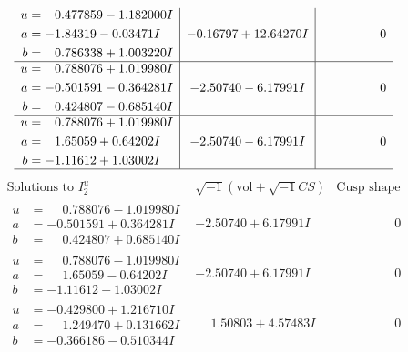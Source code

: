 \documentclass[1p]{elsarticle_modified}
\theoremstyle{definition}
\newcommand{\I}{\sqrt{-1}}
\begin{document}
$$\begin{array}{c|c|c}
\begin{aligned}
u &= \phantom{-}0.477859 - 1.182000 I \\
a &= -1.84319 - 0.03471 I \\
b &= \phantom{-}0.786338 + 1.003220 I\end{aligned}
 & -0.16797 + 12.64270 I & \phantom{-0.000000 } 0 \\ \hline\begin{aligned}
u &= \phantom{-}0.788076 + 1.019980 I \\
a &= -0.501591 - 0.364281 I \\
b &= \phantom{-}0.424807 - 0.685140 I\end{aligned}
 & -2.50740 - 6.17991 I & \phantom{-0.000000 } 0 \\ \hline\begin{aligned}
u &= \phantom{-}0.788076 + 1.019980 I \\
a &= \phantom{-}1.65059 + 0.64202 I \\
b &= -1.11612 + 1.03002 I\end{aligned}
 & -2.50740 - 6.17991 I & \phantom{-0.000000 } 0\\
 \hline 
 \end{array}$$\newpage$$\begin{array}{c|c|c}  
\text{Solutions to }I^u_{2}& \I (\text{vol} + \sqrt{-1}CS) & \text{Cusp shape}\\
 \hline 
\begin{aligned}
u &= \phantom{-}0.788076 - 1.019980 I \\
a &= -0.501591 + 0.364281 I \\
b &= \phantom{-}0.424807 + 0.685140 I\end{aligned}
 & -2.50740 + 6.17991 I & \phantom{-0.000000 } 0 \\ \hline\begin{aligned}
u &= \phantom{-}0.788076 - 1.019980 I \\
a &= \phantom{-}1.65059 - 0.64202 I \\
b &= -1.11612 - 1.03002 I\end{aligned}
 & -2.50740 + 6.17991 I & \phantom{-0.000000 } 0 \\ \hline\begin{aligned}
u &= -0.429800 + 1.216710 I \\
a &= \phantom{-}1.249470 + 0.131662 I \\
b &= -0.366186 - 0.510344 I\end{aligned}
 & \phantom{-}1.50803 + 4.57483 I & \phantom{-0.000000 } 0 \\ \hline\begin{aligned}

\end{aligned}
\end{array}$$
\end{document}
